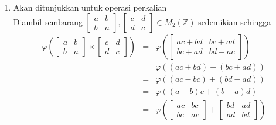\documentclass[12pt,A4paper]{article}
\begin{document}
\begin{enumerate}
\begin{enumerate}
\begin{enumerate}
\begin{eqnarray*}
\begin{bmatrix}
 	b+d & a+c
 \end{bmatrix}\right) \\
	&=& \varphi\left((a + c) - (b + d)\right) \\
	&=& \varphi\left((a-b) + (c - d)\right) \\
	&=& \varphi \left(\begin{bmatrix}
		a & b\\
		b & a
	\end{bmatrix} + \begin{bmatrix}
		c & d\\
		d & c
	\end{bmatrix}  \right)
 	\end{eqnarray*}
 $\therefore$ Terbukti bahwa operasi penjumlahan pada pemetaan $\varphi$ dapat diawetkan.
 \item Akan ditunjukkan untuk operasi perkalian
 \\ Diambil sembarang $\begin{bmatrix}
 	a & b\\
 	b & a
 \end{bmatrix}, \begin{bmatrix}
 	c & d\\
 	d & c
 \end{bmatrix} \in M_2(\mathbb{Z})$ sedemikian sehingga
\begin{eqnarray*}
	\varphi \left(\begin{bmatrix}
		a & b\\
		b & a
	\end{bmatrix} \times \begin{bmatrix}
		c & d\\
		d & c
	\end{bmatrix}  \right) &=& \varphi \left(\begin{bmatrix}
		ac + bd & bc+ad\\
		bc+ad & bd+ac
	\end{bmatrix}\right) \\
	&=& \varphi\left((ac + bd) - (bc + ad)\right) \\
	&=& \varphi\left((ac - bc) + (bd - ad)\right) \\
	&=& \varphi\left((a - b)c + (b - a)d\right) \\
	&=& \varphi \left(\begin{bmatrix}
		ac & bc\\
		bc & ac
	\end{bmatrix} + \begin{bmatrix}
		bd & ad\\
		ad & bd
	\end{bmatrix}  \right) \\

\end{eqnarray*}
\end{enumerate}
\end{enumerate}
\end{enumerate}
\end{document}
